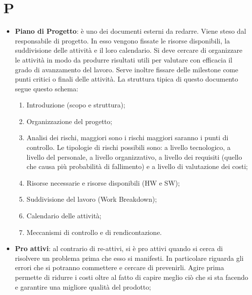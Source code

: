 %
%
%
%

\section{P}

\begin{itemize}
	\item \textbf{Piano di Progetto}: è uno dei documenti esterni da redarre. Viene steso dal responsabile di progetto. \newline
In esso vengono fissate le risorse disponibili, la suddivisione delle attività e il loro calendario. \newline
Si deve cercare di organizzare le attività in modo da produrre risultati utili per valutare con efficacia il grado di avanzamento del lavoro. \newline
Serve inoltre fissare delle milestone come punti critici o finali delle attività. \newline
La struttura tipica di questo documento segue questo schema:
	\begin{enumerate}
		\item Introduzione (scopo e struttura);
		\item Organizzazione del progetto;
		\item Analisi dei rischi, maggiori sono i rischi maggiori saranno i punti di controllo. \newline
Le tipologie di rischi possibili sono: a livello tecnologico, a livello del personale, a livello organizzativo, a livello dei requisiti (quello che causa più probabilità di fallimento) e a livello di valutazione dei costi;
		\item Risorse necessarie e risorse disponibili (HW e SW);
		\item Suddivisione del lavoro (Work Breakdown);
		\item Calendario delle attività;
		\item Meccanismi di controllo e di rendicontazione.
	\end{enumerate}
 

	\item \textbf{Pro attivi}: al contrario di re-attivi, si è pro attivi quando si cerca di risolvere un problema prima che esso si manifesti. In particolare riguarda gli errori che si potranno commettere e cercare di prevenirli. \newline
Agire prima permette di ridurre i costi oltre al fatto di capire meglio ciò che si sta facendo e garantire una migliore qualità del prodotto;


\end{itemize}
